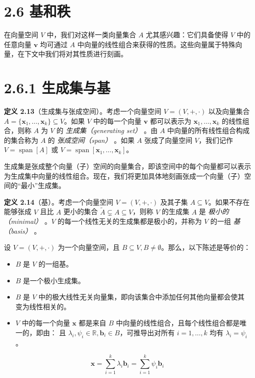 \section*{2.6 基和秩}
\label{sec:2.6}

在向量空间 $ V $ 中，我们对这样一类向量集合 $ A $ 尤其感兴趣：它们具备使得 $ V $ 中的任意向量 $ \boldsymbol{v} $ 均可通过 $ A $ 中向量的线性组合来获得的性质。这些向量属于特殊向量，在下文中我们将对其性质进行刻画。

\section*{2.6.1 生成集与基}

\textbf{定义 2.13}（生成集与张成空间）。考虑一个向量空间 $ V = (V, +, \cdot) $ 以及向量集合 $ A = \{\boldsymbol{x}_1, \ldots, \boldsymbol{x}_k\} \subseteq V $。如果 $ V $ 中的每一个向量 $ \boldsymbol{v} $ 都可以表示为 $ \boldsymbol{x}_1, \ldots, \boldsymbol{x}_k $ 的线性组合，则称 $ A $ 为 $ V $ 的 \emph{生成集（generating set）} 。由 $ A $ 中向量的所有线性组合构成的集合称为 $ A $ 的 \emph{张成空间（span）} 。如果 $ A $ 张成了向量空间 $ V $，我们记作 $ V = \operatorname{span}[A] $ 或 $ V = \operatorname{span}[\boldsymbol{x}_1, \ldots, \boldsymbol{x}_k] $。

生成集是张成整个向量（子）空间的向量集合，即该空间中的每个向量都可以表示为生成集中向量的线性组合。现在，我们将更加具体地刻画张成一个向量（子）空间的“最小”生成集。

\textbf{定义 2.14}（基）。考虑一个向量空间 $ V = (V, +, \cdot) $ 及其子集 $ A \subseteq V $。如果不存在能够张成 $ V $ 且比 $ A $ 更小的集合 $ \tilde{A} \subsetneq A \subseteq V $，则称 $ V $ 的生成集 $ A $ 是 \emph{极小的（minimal）} 。$ V $ 的每一个线性无关的生成集都是极小的，并称为 $ V $ 的一组 \emph{基（basis）} 。

设 $ V = (V, +, \cdot) $ 为一个向量空间，且 $ B \subseteq V, B \neq \emptyset $。那么，以下陈述是等价的：

\begin{itemize}
\item $ B $ 是 $ V $ 的一组基。
\item $ B $ 是一个极小生成集。
\item $ B $ 是 $ V $ 中的极大线性无关向量集，即向该集合中添加任何其他向量都会使其变为线性相关的。
\item $ V $ 中的每一个向量 $ \boldsymbol{x} $ 都是来自 $ B $ 中向量的线性组合，且每个线性组合都是唯一的，即由： 且 $ \lambda_i, \psi_i \in \mathbb{R}, \boldsymbol{b}_i \in B $，可推导出对所有 $ i = 1, \ldots, k $ 均有 $ \lambda_i = \psi_i $。
\end{itemize}
\begin{equation}
\boldsymbol{x} = \sum_{i=1}^k \lambda_i \boldsymbol{b}_i = \sum_{i=1}^k \psi_i \boldsymbol{b}_i
\tag{2.77}\label{eq:2-77}
\end{equation}
\begin{itemize}
\end{itemize}


